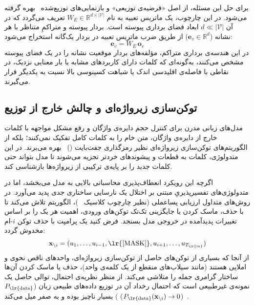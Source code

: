 برای حل این مسئله، از اصل «فرضیه‌ی توزیعی» و بازنمایی‌های توزیع‌شده~\cite{mikolov2013efficient} بهره گرفته می‌شود. در این چارچوب، یک ماتریس تعبیه به نام $W_E \in \mathbb{R}^{d \times |\mathcal{V}|}$ تعریف می‌گردد که در آن $d \ll |\mathcal{V}|$ ابعاد فضای برداری پیوسته است. بردار پیوسته و متراکمِ متناظر با هر نشانه ($\mathbf{e}_v \in \mathbb{R}^d$) از طریق ضرب ماتریس تعبیه در بردار یک‌گانه استخراج می‌شود:
\begin{equation}\label{eq:chap2_embedding_lookup}
    \mathbf{e}_v = W_E \, \mathbf{o}_v
\end{equation}
در این هندسه‌ی برداری متراکم، مؤلفه‌های بردار موقعیت نشانه را در یک فضای پیوسته مشخص می‌کنند، به‌گونه‌ای که کلمات دارای کاربردهای مشابه یا بار معنایی نزدیک، در نقاطی با فاصله‌ی اقلیدسی اندک یا شباهت کسینوسی بالا نسبت به یکدیگر قرار می‌گیرند.


\subsection{توکن‌سازی زیرواژه‌ای و چالش خارج از توزیع}\label{sec:2-3-2}

مدل‌های زبانی مدرن برای کنترل حجم دایره‌ی واژگان و رفع مشکل مواجهه با کلمات خارج از دایره‌ی واژگان، متن خام را به کلمات کامل تفکیک نمی‌کنند؛ بلکه از الگوریتم‌های توکن‌سازی زیرواژه‌ای نظیر رمزگذاری جفت‌بایت ()~\cite{sennrich2016neural} بهره می‌برند. در این متدولوژی، کلمات به قطعات و پیشوندهای خردتر تجزیه می‌شوند تا مدل بتواند حتی کلمات جدید را بر پایه‌ی ترکیبی از زیرواژه‌ها بازشناسی کند.

اگرچه این رویکرد انعطاف‌پذیری محاسباتی بالایی به مدل می‌بخشد، اما در متدولوژی‌های تفسیرپذیریِ مبتنی بر اختلال یک نارسایی ساختاری جدی پدید می‌آورد. در روش‌های متداول ارزیابی پساعملی (نظیر چارچوب کلاسیک ~\cite{ribeiro2016lime})، الگوریتم تلاش می‌کند تا با حذف، ماسک کردن یا جایگزینی تک‌تک توکن‌های ورودی، اهمیت هر یک را بر اساس تغییرات پدیدآمده در خروجی مدل بسنجد. فرض کنید یک پرامپت با حذف توکن $i$-ام مخدوش گردد:
\begin{equation}\label{eq:chap2_perturbation_basis}
    \mathbf{x}_{\setminus i} = (u_1, \dots, u_{i-1}, \text{\lr{[MASK]}}, u_{i+1}, \dots, u_{T_{\text{\lr{in}}}})
\end{equation}
از آنجا که بسیاری از توکن‌های حاصل از توکن‌سازی زیرواژه‌ای، واحدهای ناقص نحوی و املایی هستند (مانند سیلاب‌های منقطع از یک کلمه‌ی واحد)، حذف یا ماسک کردن آن‌ها ساختار گرامری جمله را متلاشی می‌کند. از منظر نظریه‌ی احتمال، توالی حاصل یک نمونه‌ی غیرطبیعی است که احتمال رخداد آن در توزیع داده‌های طبیعی زبان ($P_{\text{\lr{data}}}$) بسیار ناچیز بوده و به صفر میل می‌کند ($P_{\text{\lr{data}}}(\mathbf{x}_{\setminus i}) \to 0$)~\cite{feng2018pathologies}. 

